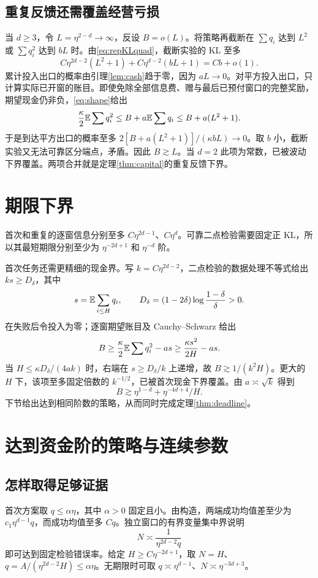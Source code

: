 \subsection{重复反馈还需覆盖经营亏损}
当 $d\geq3$，令 $L=\eta^{2-d}\to\infty$，反设 $B=o(L)$。将策略再截断在 $\sum q_i$ 达到 $L^2$ 或 $\sum q_i^2$ 达到 $bL$ 时。由\eqref{eq:repKLquad}，截断实验的 KL 至多
\[
 C\eta^{2d-2}(L^2+1)+C\eta^{d-2}(bL+1)=Cb+o(1).
\]
累计投入出口的概率由引理\ref{lem:cash}趋于零，因为 $aL\to0$。对平方投入出口，只计算实际已开窗的账目。即使免除全部信息费、赠与最后已预付窗口的完整奖励，期望现金仍非负，\eqref{eq:shape}给出
\[
 \frac\kappa2\mathbb E\sum q_i^2\leq B+a\mathbb E\sum q_i\leq B+a(L^2+1).
\]
于是到达平方出口的概率至多 $2[B+a(L^2+1)]/(\kappa bL)\to0$。取 $b$ 小，截断实验又无法可靠区分端点，矛盾。因此 $B\gtrsim L$。当 $d=2$ 此项为常数，已被波动下界覆盖。两项合并就是定理\ref{thm:capital}的重复反馈下界。

\section{期限下界}\label{app:deadline}
首次和重复的逐窗信息分别至多 $C\eta^{2d-1}$、$C\eta^d$。可靠二点检验需要固定正 KL，所以其最短期限分别至少为 $\eta^{-2d+1}$ 和 $\eta^{-d}$ 阶。

首次任务还需更精细的现金界。写 $k=C\eta^{2d-2}$，二点检验的数据处理不等式给出 $ks\geq D_\delta$，其中
\[
 s=\mathbb E\sum_{i\leq H}q_i,\qquad
 D_\delta=(1-2\delta)\log\frac{1-\delta}{\delta}>0.
\]
在失败后令投入为零；逐窗期望账目及 Cauchy--Schwarz 给出
\[
 B\geq\frac\kappa2\mathbb E\sum q_i^2-as
   \geq\frac{\kappa s^2}{2H}-as.
\]
当 $H\leq\kappa D_\delta/(4ak)$ 时，右端在 $s\geq D_\delta/k$ 上递增，故 $B\gtrsim1/(k^2H)$。更大的 $H$ 下，该项至多固定倍数的 $k^{-1/2}$，已被首次现金下界覆盖。由 $a\asymp\sqrt k$ 得到
\[
 B\gtrsim\eta^{1-d}+\eta^{-4d+4}/H.
\]
下节给出达到相同阶数的策略，从而同时完成定理\ref{thm:deadline}。

\section{达到资金阶的策略与连续参数}\label{app:upper}
\subsection{怎样取得足够证据}
首次方案取 $q\leq\alpha\eta$，其中 $\alpha>0$ 固定且小。由构造，两端成功均值差至少为 $c_1\eta^{d-1}q$，而成功均值至多 $Cq$。独立窗口的有界变量集中界说明
\[
 N\asymp\frac1{\eta^{2d-2}q}
\]
即可达到固定检验错误率。给定 $H\geq C\eta^{-2d+1}$，取 $N=H$、$q=A/(\eta^{2d-2}H)\leq\alpha\eta$。无期限时可取 $q\asymp\eta^{d-1}$、$N\asymp\eta^{-3d+3}$。

